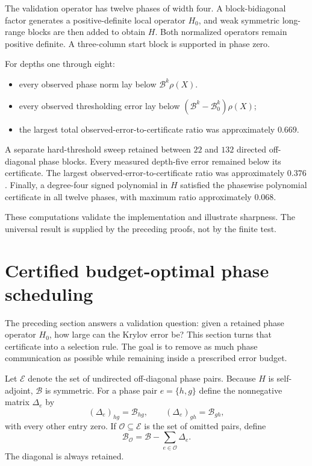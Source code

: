 The validation operator has twelve phases of width four.  A block-bidiagonal
factor generates a positive-definite local operator $H_0$, and weak symmetric
long-range blocks are then added to obtain $H$.  Both normalized operators
remain positive definite.  A three-column start block is supported in phase
zero.

For depths one through eight:
\begin{itemize}
\item every observed phase norm lay below $\mathcal B^k\rho(X)$.
\item every observed thresholding error lay below
$(\mathcal B^k-\mathcal B_0^k)\rho(X)$;
\item the largest total observed-error-to-certificate ratio was approximately
$0.669$.
\end{itemize}

A separate hard-threshold sweep retained between $22$ and $132$ directed
off-diagonal phase blocks.  Every measured depth-five error remained below its
certificate. The largest observed-error-to-certificate ratio was approximately
$0.376$.  Finally, a degree-four signed polynomial in $H$ satisfied the
phasewise polynomial certificate in all twelve phases, with maximum ratio
approximately $0.068$.

These computations validate the implementation and illustrate sharpness.  The
universal result is supplied by the preceding proofs, not by the finite test.



\section{Certified budget-optimal phase scheduling}\label{sec:final-16}
\label{sec:budget-scheduler}

The preceding section answers a validation question: given a retained phase
operator $H_0$, how large can the Krylov error be?  This section turns that
certificate into a selection rule.  The goal is to remove as much phase
communication as possible while remaining inside a prescribed error budget.

Let $\mathcal E$ denote the set of undirected off-diagonal phase pairs.  Because
$H$ is self-adjoint, $\mathcal B$ is symmetric.  For a phase pair
$e=\{h,g\}$ define the nonnegative matrix $\Delta_e$ by
\[
(\Delta_e)_{hg}=\mathcal B_{hg},\qquad
(\Delta_e)_{gh}=\mathcal B_{gh},
\]
with every other entry zero.  If $\mathcal O\subseteq\mathcal E$ is the set
of omitted pairs, define
\[
\mathcal B_{\mathcal O}
=\mathcal B-\sum_{e\in\mathcal O}\Delta_e.
\]
The diagonal is always retained.

